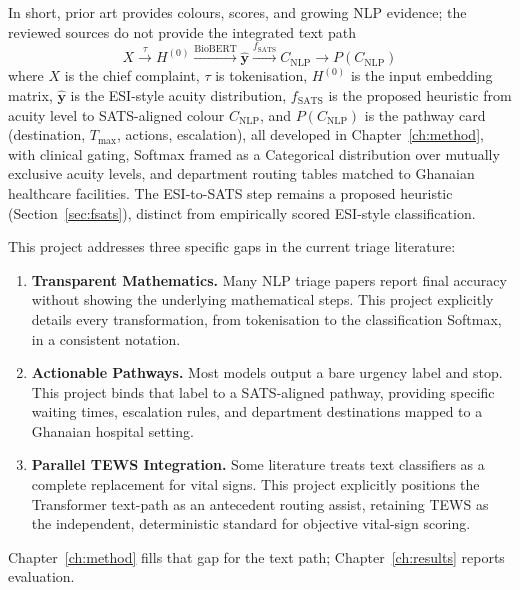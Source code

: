 In short, prior art provides colours, scores, and growing NLP evidence; the reviewed sources do not provide the integrated text path
\[
  X \xrightarrow{\tau} H^{(0)} \xrightarrow{\mathrm{BioBERT}} \hat{\mathbf{y}} \xrightarrow{f_{\mathrm{SATS}}} C_{\mathrm{NLP}} \xrightarrow{} P(C_{\mathrm{NLP}})
\]
where \(X\) is the chief complaint, \(\tau\) is tokenisation, \(H^{(0)}\) is the input embedding matrix, \(\hat{\mathbf{y}}\) is the ESI-style acuity distribution, \(f_{\mathrm{SATS}}\) is the proposed heuristic from acuity level to SATS-aligned colour \(C_{\mathrm{NLP}}\), and \(P(C_{\mathrm{NLP}})\) is the pathway card (destination, \(T_{\max}\), actions, escalation), all developed in Chapter~\ref{ch:method},
with clinical gating, Softmax framed as a Categorical distribution over mutually exclusive acuity levels, and department routing tables matched to Ghanaian healthcare facilities. The ESI-to-SATS step remains a proposed heuristic (Section~\ref{sec:fsats}), distinct from empirically scored ESI-style classification.

This project addresses three specific gaps in the current triage literature:

\begin{enumerate}
\item \textbf{Transparent Mathematics.} Many NLP triage papers report final accuracy without showing the underlying mathematical steps. This project explicitly details every transformation, from tokenisation to the classification Softmax, in a consistent notation.
\item \textbf{Actionable Pathways.} Most models output a bare urgency label and stop. This project binds that label to a SATS-aligned pathway, providing specific waiting times, escalation rules, and department destinations mapped to a Ghanaian hospital setting.
\item \textbf{Parallel TEWS Integration.} Some literature treats text classifiers as a complete replacement for vital signs. This project explicitly positions the Transformer text-path as an antecedent routing assist, retaining TEWS as the independent, deterministic standard for objective vital-sign scoring.
\end{enumerate}

Chapter~\ref{ch:method} fills that gap for the text path; Chapter~\ref{ch:results} reports evaluation.
